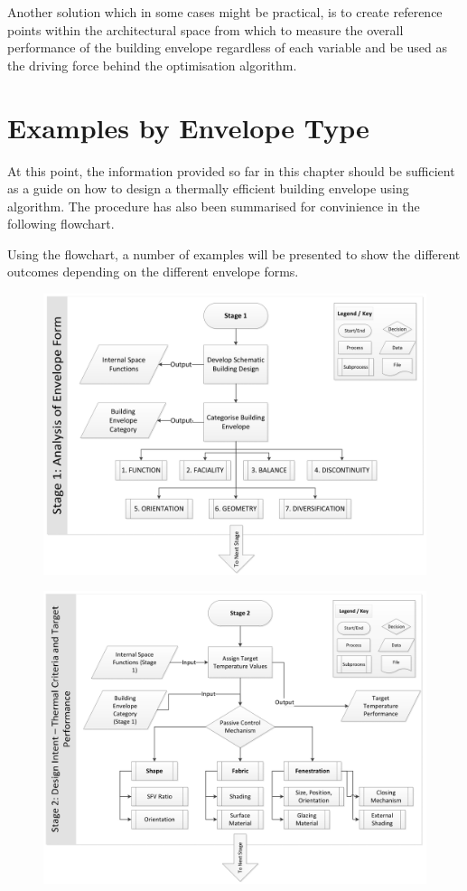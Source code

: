 Another solution which in some cases might be practical, is to create reference points within the architectural space from which to measure the overall performance of the building envelope regardless of each variable and be used as the driving force behind the optimisation algorithm.


\clearpage
\section{Examples by Envelope Type}

At this point, the information provided so far in this chapter should be sufficient as a guide on how to design a thermally efficient building envelope using algorithm. The procedure has also been summarised for convinience in the following flowchart.

Using the flowchart, a number of examples will be presented to show the different outcomes depending on the different envelope forms.

\clearpage
\begin{figure}
	\centering
	\includegraphics[width=18cm]{./Images/9a-Flowchart}
\end{figure}

\begin{figure}
	\centering
	\includegraphics[width=18cm]{./Images/9b-Flowchart}
\end{figure}

